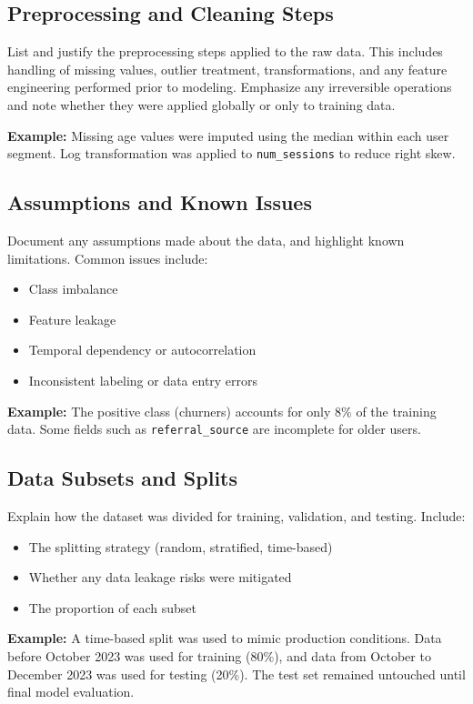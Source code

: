 \documentclass[12pt,openany]{book}
\begin{document}
\subsection{Preprocessing and Cleaning Steps}

List and justify the preprocessing steps applied to the raw data. This includes handling of missing values, outlier treatment, transformations, and any feature engineering performed prior to modeling. Emphasize any irreversible operations and note whether they were applied globally or only to training data.

\textbf{Example:} Missing age values were imputed using the median within each user segment. Log transformation was applied to \texttt{num\_sessions} to reduce right skew.

\subsection{Assumptions and Known Issues}

Document any assumptions made about the data, and highlight known limitations. Common issues include:
\begin{itemize}
    \item Class imbalance
    \item Feature leakage
    \item Temporal dependency or autocorrelation
    \item Inconsistent labeling or data entry errors
\end{itemize}

\textbf{Example:} The positive class (churners) accounts for only 8\% of the training data. Some fields such as \texttt{referral\_source} are incomplete for older users.

\subsection{Data Subsets and Splits}

Explain how the dataset was divided for training, validation, and testing. Include:
\begin{itemize}
    \item The splitting strategy (random, stratified, time-based)
    \item Whether any data leakage risks were mitigated
    \item The proportion of each subset
\end{itemize}

\textbf{Example:} A time-based split was used to mimic production conditions. Data before October 2023 was used for training (80\%), and data from October to December 2023 was used for testing (20\%). The test set remained untouched until final model evaluation.
\end{document}
